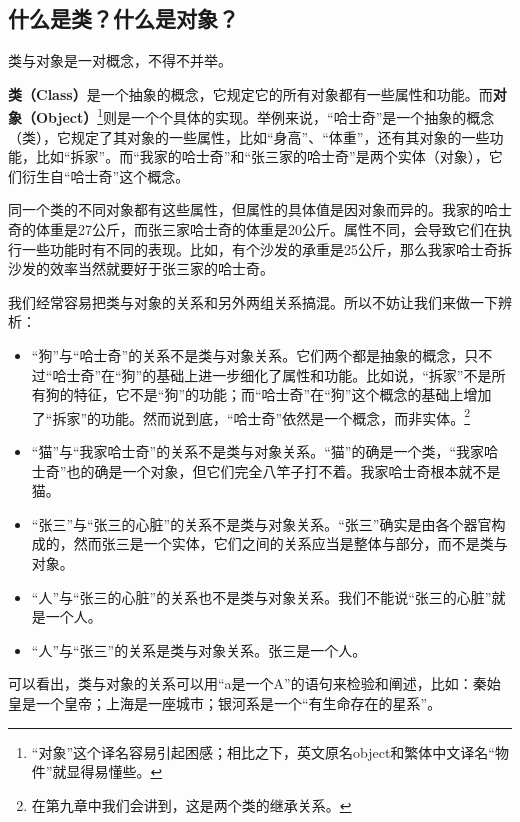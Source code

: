 \subsection*{什么是类？什么是对象？}
类与对象是一对概念，不得不并举。\par
\textbf{类（Class）}是一个抽象的概念，它规定它的所有对象都有一些属性和功能。而\textbf{对象（Object）}\footnote{``对象''这个译名容易引起困感；相比之下，英文原名object和繁体中文译名``物件''就显得易懂些。}则是一个个具体的实现。举例来说，``哈士奇''是一个抽象的概念（类），它规定了其对象的一些属性，比如``身高''、``体重''，还有其对象的一些功能，比如``拆家''。而``我家的哈士奇''和``张三家的哈士奇''是两个实体（对象），它们衍生自``哈士奇''这个概念。\par
同一个类的不同对象都有这些属性，但属性的具体值是因对象而异的。我家的哈士奇的体重是27公斤，而张三家哈士奇的体重是20公斤。属性不同，会导致它们在执行一些功能时有不同的表现。比如，有个沙发的承重是25公斤，那么我家哈士奇拆沙发的效率当然就要好于张三家的哈士奇。\par
我们经常容易把类与对象的关系和另外两组关系搞混。所以不妨让我们来做一下辨析：\par
\begin{itemize}
    \item ``狗''与``哈士奇''的关系不是类与对象关系。它们两个都是抽象的概念，只不过``哈士奇''在``狗''的基础上进一步细化了属性和功能。比如说，``拆家''不是所有狗的特征，它不是``狗''的功能；而``哈士奇''在``狗''这个概念的基础上增加了``拆家''的功能。然而说到底，``哈士奇''依然是一个概念，而非实体。\footnote{在第九章中我们会讲到，这是两个类的继承关系。}
    \item ``猫''与``我家哈士奇''的关系不是类与对象关系。``猫''的确是一个类，``我家哈士奇''也的确是一个对象，但它们完全八竿子打不着。我家哈士奇根本就不是猫。
    \item ``张三''与``张三的心脏''的关系不是类与对象关系。``张三''确实是由各个器官构成的，然而张三是一个实体，它们之间的关系应当是整体与部分，而不是类与对象。
    \item ``人''与``张三的心脏''的关系也不是类与对象关系。我们不能说``张三的心脏''就是一个人。
    \item ``人''与``张三''的关系是类与对象关系。张三是一个人。
\end{itemize}
可以看出，类与对象的关系可以用``a是一个A''的语句来检验和阐述，比如：秦始皇是一个皇帝；上海是一座城市；银河系是一个``有生命存在的星系''。\par
